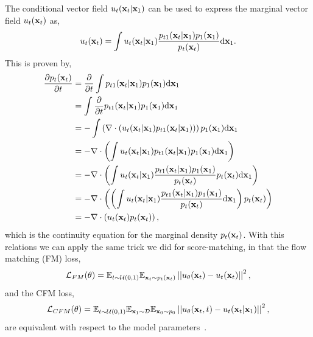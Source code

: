 The conditional vector field $u_t(\mathbf{x}_t | \mathbf{x}_1)$ can be used to express the marginal vector field $u_t(\mathbf{x}_t)$ as,
\begin{equation}
    \label{eq:conditional_to_marginal}
    u_t(\mathbf{x}_t) = \int u_t(\mathbf{x}_t | \mathbf{x}_1) \frac{p_{t1}(\mathbf{x}_t | \mathbf{x}_1) p_1(\mathbf{x}_1)}{p_t(\mathbf{x}_t)} \mathrm{d} \mathbf{x}_1.
\end{equation}
This is proven by,
\begin{equation}
    \begin{aligned}
    \frac{\partial p_t(\mathbf{x}_t)}{\partial t}
    &= \frac{\partial}{\partial t} \int p_{t1}(\mathbf{x}_t | \mathbf{x}_1) p_1(\mathbf{x}_1) \mathrm{d} \mathbf{x}_1 \\
    &= \int \frac{\partial}{\partial t} p_{t1}(\mathbf{x}_t | \mathbf{x}_1) p_1(\mathbf{x}_1) \mathrm{d} \mathbf{x}_1 \\
    &= - \int \left(\nabla \cdot (u_t(\mathbf{x}_t | \mathbf{x}_1) p_{t1}(\mathbf{x}_t | \mathbf{x}_1))\right) p_1(\mathbf{x}_1) \mathrm{d} \mathbf{x}_1 \\
    &= - \nabla \cdot \left(\int u_t(\mathbf{x}_t | \mathbf{x}_1) p_{t1}(\mathbf{x}_t | \mathbf{x}_1) p_1(\mathbf{x}_1) \mathrm{d} \mathbf{x}_1\right) \\
    &= - \nabla \cdot \left(\int u_t(\mathbf{x}_t | \mathbf{x}_1) \frac{p_{t1}(\mathbf{x}_t | \mathbf{x}_1) p_1(\mathbf{x}_1)}{p_t(\mathbf{x}_t)} p_t(\mathbf{x}_t) \mathrm{d} \mathbf{x}_1\right) \\
    &= - \nabla \cdot \left(\left(\int u_t(\mathbf{x}_t | \mathbf{x}_1) \frac{p_{t1}(\mathbf{x}_t | \mathbf{x}_1) p_1(\mathbf{x}_1)}{p_t(\mathbf{x}_t)} \mathrm{d} \mathbf{x}_1\right) p_t(\mathbf{x}_t) \right) \\
    &= - \nabla \cdot \left(u_t(\mathbf{x}_t) p_t(\mathbf{x}_t)\right),
    \end{aligned}
\end{equation}
which is the continuity equation for the marginal density $p_t(\mathbf{x}_t)$.
With this relations we can apply the same trick we did for score-matching, in that the flow matching (FM) loss,
\begin{equation}
    \label{eq:fm_loss}
    \mathcal{L}_{FM}(\theta) =
    \mathbb{E}_{t \sim \mathcal{U}(0, 1)}
    \mathbb{E}_{\mathbf{x}_t \sim p_t(\mathbf{x}_t)}
    \left|\left|u_\theta(\mathbf{x}_t) - u_t(\mathbf{x}_t)\right|\right|^2,
\end{equation}
and the CFM loss,
\begin{equation}
    \label{eq:cfm_loss}
    \mathcal{L}_{CFM}(\theta) =
    \mathbb{E}_{t \sim \mathcal{U}(0, 1)}
    \mathbb{E}_{\mathbf{x}_1 \sim \mathcal{D}}
    \mathbb{E}_{\mathbf{x}_0 \sim p_0}
    \left|\left|u_\theta(\mathbf{x}_t, t) - u_t(\mathbf{x}_t | \mathbf{x}_1)\right|\right|^2,
\end{equation}
are equivalent with respect to the model parameters~\cite{FlowMatchingGenerative}.

